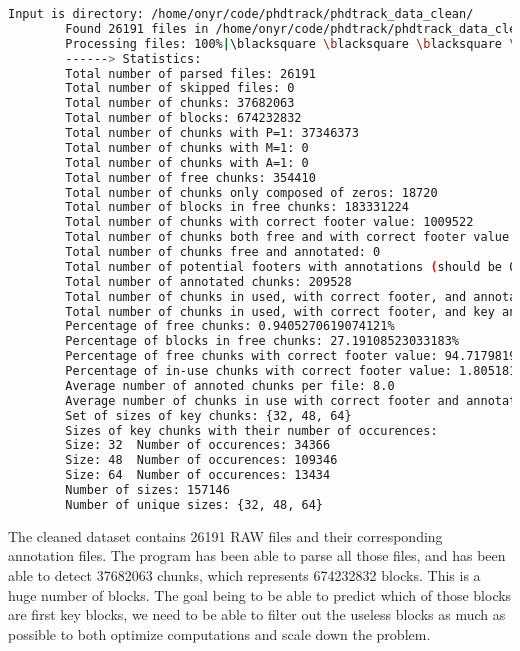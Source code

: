     \begin{lstlisting}[language=bash, caption={Printing cleaned dataset chunk parsing global statistics.}]
        Input is directory: /home/onyr/code/phdtrack/phdtrack_data_clean/
        Found 26191 files in /home/onyr/code/phdtrack/phdtrack_data_clean/.
        Processing files: 100%|\blacksquare \blacksquare \blacksquare \blacksquare \blacksquare | 26191/26191 [12:11<00:00, 35.81it/s, file=7091-1650972335]
        ------> Statistics:
        Total number of parsed files: 26191
        Total number of skipped files: 0
        Total number of chunks: 37682063
        Total number of blocks: 674232832
        Total number of chunks with P=1: 37346373
        Total number of chunks with M=1: 0
        Total number of chunks with A=1: 0
        Total number of free chunks: 354410
        Total number of chunks only composed of zeros: 18720
        Total number of blocks in free chunks: 183331224
        Total number of chunks with correct footer value: 1009522
        Total number of chunks both free and with correct footer value: 335690
        Total number of chunks free and annotated: 0
        Total number of potential footers with annotations (should be 0): 0
        Total number of annotated chunks: 209528
        Total number of chunks in used, with correct footer, and annotated: 7668
        Total number of chunks in used, with correct footer, and key annotated: 7668
        Percentage of free chunks: 0.9405270619074121%
        Percentage of blocks in free chunks: 27.19108523033183%
        Percentage of free chunks with correct footer value: 94.71798199825061%
        Percentage of in-use chunks with correct footer value: 1.8051818044922352%
        Average number of annoted chunks per file: 8.0
        Average number of chunks in use with correct footer and annotated per file: 0.2927723263716544
        Set of sizes of key chunks: {32, 48, 64}
        Sizes of key chunks with their number of occurences:
        Size: 32  Number of occurences: 34366
        Size: 48  Number of occurences: 109346
        Size: 64  Number of occurences: 13434
        Number of sizes: 157146
        Number of unique sizes: {32, 48, 64}
    \end{lstlisting}

    The cleaned dataset contains 26191 RAW files and their corresponding annotation files. The program has been able to parse all those files, and has been able to detect 37682063 chunks, which represents 674232832 blocks. This is a huge number of blocks. The goal being to be able to predict which of those blocks are first key blocks, we need to be able to filter out the useless blocks as much as possible to both optimize computations and scale down the problem. 

